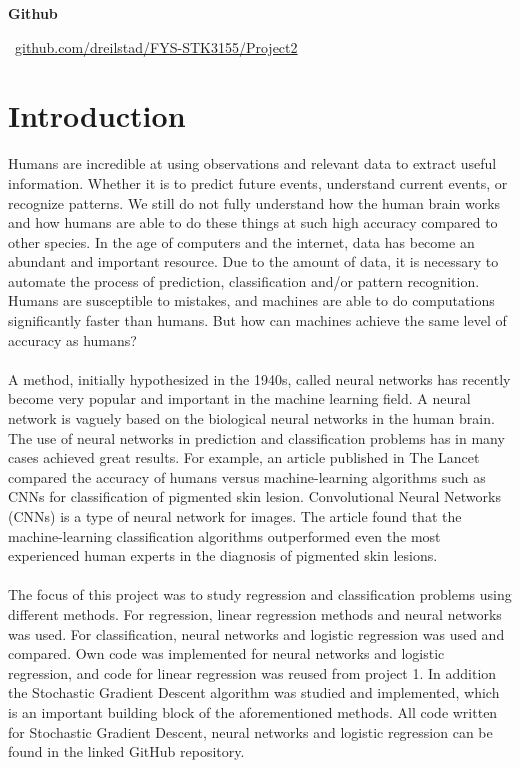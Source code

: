 \documentclass[a4paper,twocolumn]{article}
\begin{document}
\raggedbottom
\begin{center}
    \small \textbf{Github}
    
    \vspace{0.2cm}
    
    \faGithub \ \small \href{https://github.com/dreilstad/FYS-STK3155/tree/master/Project2}{github.com/dreilstad/FYS-STK3155/Project2}
\end{center}
\vspace{0.5cm}
\section{Introduction}
Humans are incredible at using observations and relevant data to extract useful information. Whether it is to predict future events, understand current events, or recognize patterns. We still do not fully understand how the human brain works and how humans are able to do these things at such high accuracy compared to other species. In the age of computers and the internet, data has become an abundant and important resource. Due to the amount of data, it is necessary to automate the process of prediction, classification and/or pattern recognition. Humans are susceptible to mistakes, and machines are able to do computations significantly faster than humans. But how can machines achieve the same level of accuracy as humans?\\
\\
A method, initially hypothesized in the 1940s, called neural networks has recently become very popular and important in the machine learning field. A neural network is vaguely based on the biological neural networks in the human brain. The use of neural networks in prediction and classification problems has in many cases achieved great results. For example, an article\cite{skin} published in The Lancet compared the accuracy of humans versus machine-learning algorithms such as CNNs for classification of pigmented skin lesion. Convolutional Neural Networks (CNNs) is a type of neural network for images. The article found that the machine-learning classification algorithms outperformed even the most experienced human experts in the diagnosis of pigmented skin lesions.\\
\\
The focus of this project was to study regression and classification problems using different methods. For regression, linear regression methods and neural networks was used. For classification, neural networks and logistic regression was used and compared. Own code was implemented for neural networks and logistic regression, and code for linear regression was reused from project 1.\cite{project1} In addition the Stochastic Gradient Descent algorithm was studied and implemented, which is an important building block of the aforementioned methods. All code written for Stochastic Gradient Descent, neural networks and logistic regression can be found in the linked GitHub repository. \\
\end{document}
